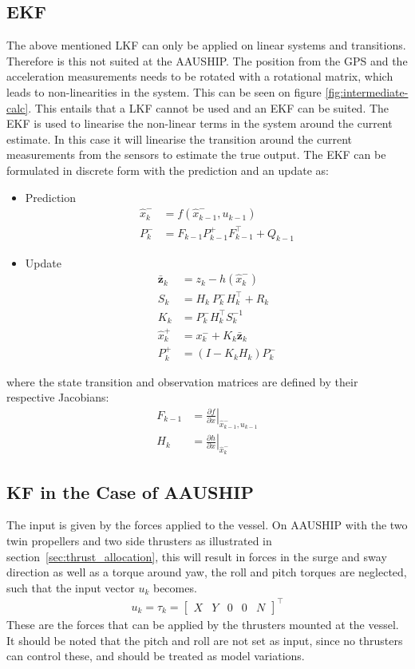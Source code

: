 \subsection{\acl{EKF}}
The above mentioned \ac{LKF} can only be applied on linear systems and transitions. Therefore is this not suited at the AAUSHIP. The position from the \ac{GPS} and the acceleration measurements needs to be rotated with a rotational matrix, which leads to non-linearities in the system. This can be seen on figure \vref{fig:intermediate-calc}. This entails that a \ac{LKF} cannot be used and an \ac{EKF} can be suited. The \ac{EKF} is used to linearise the non-linear terms in the system around the current estimate. In this case it will linearise the transition around the current measurements from the sensors to estimate the true output. The \ac{EKF} can be formulated in discrete form with the prediction and an update as:
\begin{itemize}\tightlist
\item Prediction
\begin{align}
\hat x_k^- &= f(\hat x_{k-1}^-,u_{k-1})\\
P_k^- &= F_{k-1}P_{k-1}^+F_{k-1}^\top+Q_{k-1}
\end{align}
\item Update
\begin{align}
\bar{\mathbf{z}}_k &= z_k - h(\hat x_k^-)\\
S_k &= H_k\ P_k^-H_k^\top + R_k\\
K_k &= P_k^-H_k^\top S_k^{-1}\\
\hat x_k^+ &= x_k^- + K_k \bar{\mathbf{z}}_k\\
P_k^+ &= (I - K_k H_k) P_k^-
\end{align}
\end{itemize}
where the state transition and observation matrices are defined by their respective Jacobians:
\begin{align}
F_{k-1} &= \left.\frac{\partial f}{\partial x}\right|_{\hat x_{k-1}^-,u_{k-1}} \label{eq:EKFF}\\
H_k &= \left.\frac{\partial h}{\partial x}\right|_{\hat x_{k}^-}
\end{align}

\subsection{\acl{KF} in the Case of AAUSHIP}
\label{sec:kfonaauship}
The input is given by the forces applied to the vessel. On AAUSHIP with the two twin propellers and two side thrusters as illustrated in section~\vref{sec:thrust_allocation}, this will result in forces in the surge and sway direction as well as a torque around yaw, the roll and pitch torques are neglected, such that the input vector $u_k$ becomes.
\begin{align}
u_k = \tau_k =
\begin{bmatrix}
X & Y & 0 & 0 & N
\end{bmatrix}^\top
\end{align}
These are the forces that can be applied by the thrusters mounted at the vessel. It should be noted that the pitch and roll are not set as input, since no thrusters can control these, and should be treated as model variations.

